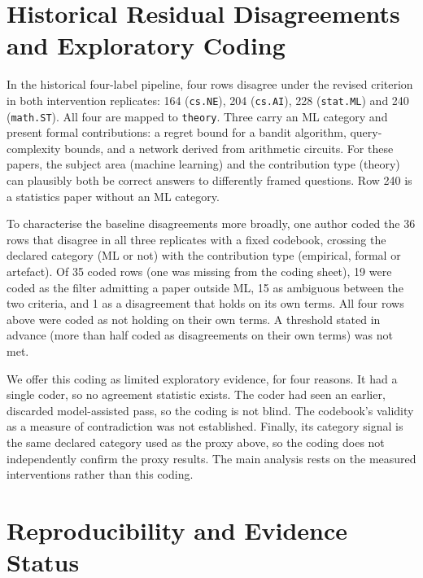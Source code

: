 \documentclass[11pt]{article}
\begin{document}
\section{Historical Residual Disagreements and Exploratory Coding}
\label{app:coding}

In the historical four-label pipeline, four rows disagree under the revised
criterion in both intervention replicates: 164
(\texttt{cs.NE}), 204 (\texttt{cs.AI}), 228 (\texttt{stat.ML}) and 240
(\texttt{math.ST}). All four are mapped to \texttt{theory}. Three carry an
ML category and present formal contributions: a regret bound for a bandit
algorithm, query-complexity bounds, and a network derived from arithmetic
circuits. For these papers, the subject area (machine learning) and the
contribution type (theory) can plausibly both be correct answers to
differently framed questions. Row 240 is a statistics paper without an ML
category.

To characterise the baseline disagreements more broadly, one author coded
the 36 rows that disagree in all three replicates with a fixed codebook,
crossing the declared category (ML or not) with the contribution type
(empirical, formal or artefact). Of 35 coded rows (one was missing from the
coding sheet), 19 were coded as the filter admitting a paper outside ML, 15
as ambiguous between the two criteria, and 1 as a disagreement that holds on
its own terms. All four rows above were coded as not holding on their own
terms. A threshold stated in advance (more than half coded as disagreements
on their own terms) was not met.

We offer this coding as limited exploratory evidence, for four reasons. It
had a single coder, so no agreement statistic exists. The coder had seen an
earlier, discarded model-assisted pass, so the coding is not blind. The
codebook's validity as a measure of contradiction was not established.
Finally, its category signal is the same declared category used as the proxy
above, so the coding does not independently confirm the proxy results. The
main analysis rests on the measured interventions rather than this coding.

\section{Reproducibility and Evidence Status}
\label{sec:reproducibility}
\end{document}
